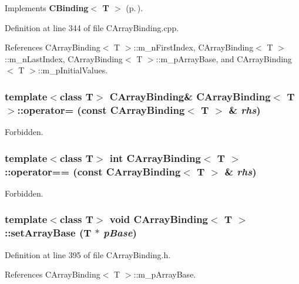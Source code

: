 Implements {\bf CBinding$<$ T $>$} {\rm (p.\,\pageref{classCBinding_a0})}.

Definition at line 344 of file CArray\-Binding.cpp.

References CArray\-Binding$<$ T $>$::m\_\-n\-First\-Index, CArray\-Binding$<$ T $>$::m\_\-n\-Last\-Index, CArray\-Binding$<$ T $>$::m\_\-p\-Array\-Base, and CArray\-Binding$<$ T $>$::m\_\-p\-Initial\-Values.
\subsubsection{\setlength{\rightskip}{0pt plus 5cm}template$<$class T$>$ CArray\-Binding\& CArray\-Binding$<$ T $>$::operator= (const CArray\-Binding$<$ T $>$ \& {\em rhs})\hspace{0.3cm}{\tt  [private]}}\label{classCArrayBinding_c1}


Forbidden.

\subsubsection{\setlength{\rightskip}{0pt plus 5cm}template$<$class T$>$ int CArray\-Binding$<$ T $>$::operator== (const CArray\-Binding$<$ T $>$ \& {\em rhs})\hspace{0.3cm}{\tt  [private]}}\label{classCArrayBinding_c2}


Forbidden.

\subsubsection{\setlength{\rightskip}{0pt plus 5cm}template$<$class T$>$ void CArray\-Binding$<$ T $>$::set\-Array\-Base (T $\ast$ {\em p\-Base})\hspace{0.3cm}{\tt  [inline, protected]}}\label{classCArrayBinding_b1}




Definition at line 395 of file CArray\-Binding.h.

References CArray\-Binding$<$ T $>$::m\_\-p\-Array\-Base.
